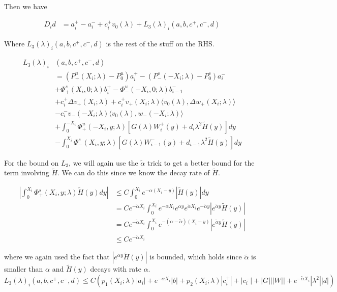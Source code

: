 \documentclass[12pt]{article}
\begin{document}
\begin{enumerate}
Then we have 

\begin{align*}
D_i d &= a_i^+ - a_i^- + c_i^+ v_0(\lambda) + L_3(\lambda)_i(a, b, c^+, c^-, d)
\end{align*}

Where $L_3(\lambda)_i(a, b, c^+, c^-, d)$ is the rest of the stuff on the RHS.

\begin{align*}
L_3(\lambda)_i&(a, b, c^+, c^-, d) \\ 
&= (P^u_+(X_i; \lambda) - P_0^u)a_i^+ - (P^s_-(-X_i; \lambda) - P_0^s)a_i^- \\
&+ \Phi^s_+(X_i, 0; \lambda)b_i^+ - \Phi^u_-(-X_i, 0; \lambda)b_{i-1}^- \\
&+ c_i^+ \Delta v_+(X_i; \lambda) + c_i^+ v_+(X_i; \lambda) \langle v_0(\lambda), \Delta w_+(X_i; \lambda) \rangle \\
&- c_i^- v_-(-X_i; \lambda) \langle v_0(\lambda), w_-(-X_i; \lambda) \rangle \\
&+ \int_0^{-X_i} \Phi^u_+(-X_i, y; \lambda) [ G(\lambda)W_i^+(y) + d_i \lambda^2 \tilde{H}(y) ] dy \\
&- \int_0^{X_i} \Phi^s_-(X_i, y; \lambda) [ G(\lambda)W_{i-1}^-(y) + d_{i-1} \lambda^2 \tilde{H}(y) ] dy
\end{align*}

For the bound on $L_3$, we will again use the $\tilde{\alpha}$ trick to get a better bound for the term involving $\tilde{H}$. We can do this since we know the decay rate of $\tilde{H}$.

\begin{align*}
\left| \int_0^{X_i} \Phi^s_+(X_i, y; \lambda) \tilde{H}(y) dy \right| 
&\leq C \int_0^{X_i} e^{-\alpha (X_i - y)}|\tilde{H}(y)| dy \\
&= C e^{-\tilde{\alpha}X_i} \int_0^{X_i} e^{-\alpha X_i} e^{\alpha y}  e^{\tilde{\alpha}X_i} e^{-\tilde{\alpha}y} |e^{\tilde{\alpha}y} \tilde{H}(y)| \\
&= C e^{-\tilde{\alpha}X_i} \int_0^{X_i} e^{-(\alpha - \tilde{\alpha})(X_i-y)} |e^{\tilde{\alpha}y} \tilde{H}(y)|\\
&\leq C e^{-\tilde{\alpha}X_i} 
\end{align*}

where we again used the fact that $|e^{\tilde{\alpha}y} \tilde{H}(y)|$ is bounded, which holds since $\tilde{\alpha}$ is smaller than $\alpha$ and $\tilde{H}(y)$ decays with rate $\alpha$.\\

\[
L_3(\lambda)_i(a, b, c^+, c^-, d) \leq C ( p_1(X_i; \lambda)|a_i|
+ e^{-\alpha X_i}|b| + p_2(X_i; \lambda)|c_i^+| + |c_i^-| + |G| ||W|| + e^{-\tilde{\alpha} X_i} |\lambda^2| |d| )
\]


\end{enumerate}
\end{document}
